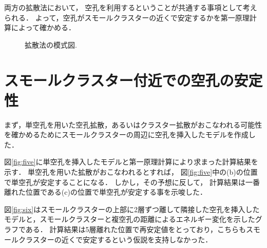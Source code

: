 \documentclass[a4j,twocolumn]{jsarticle}
\begin{document}
両方の拡散法において，
空孔を利用するということが共通する事項として考えられる．
よって，空孔がスモールクラスターの近くで安定するかを第一原理計算によって確かめる．

\begin{figure}[htbp]
\begin{center}
    \caption{拡散法の模式図.}
    \label{fig:four}
\end{center}
\end{figure}

\vspace{-1.0\baselineskip}

\section{スモールクラスター付近での空孔の安定性}

まず，単空孔を用いた空孔拡散，あるいはクラスター拡散がおこなわれる可能性を確かめるためにスモールクラスターの周辺に空孔を挿入したモデルを作成した．

図\ref{fig:five}に単空孔を挿入したモデルと第一原理計算により求まった計算結果を示す．
単空孔を用いた拡散がおこなわれるとすれば，
図\ref{fig:five}中の(b)の位置で単空孔が安定することになる．
しかし，その予想に反して，
計算結果は一番離れた位置である(c)の位置で単空孔が安定する事を示唆した．

図\ref{fig:six}はスモールクラスターの上部に2層ずつ離して隣接した空孔を挿入したモデルと，スモールクラスターと複空孔の距離によるエネルギー変化を示したグラフである．
計算結果は5層離れた位置で再安定値をとっており，こちらもスモールクラスターの近くで安定するという仮説を支持しなかった．
\end{document}
